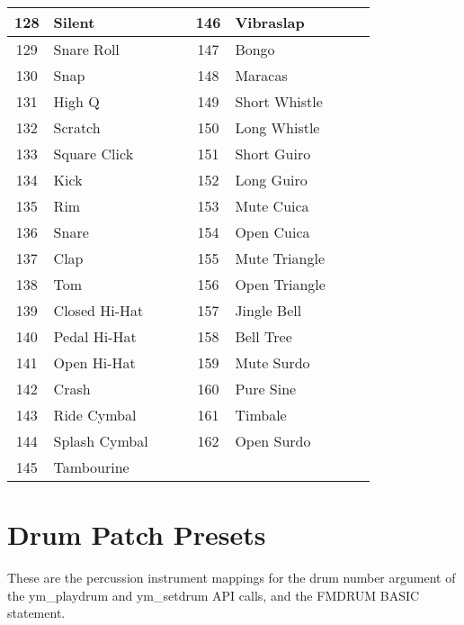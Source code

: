 \begin{tabular}{|c|p{0.4\linewidth}|c|p{0.4\linewidth}|}
	\hline
	128 & Silent & 146 & Vibraslap \\ \hline
	129 & Snare Roll & 147 & Bongo \\ \hline
	130 & Snap & 148 & Maracas \\ \hline
	131 & High Q & 149 & Short Whistle \\ \hline
	132 & Scratch & 150 & Long Whistle \\ \hline
	133 & Square Click & 151 & Short Guiro \\ \hline
	134 & Kick & 152 & Long Guiro \\ \hline
	135 & Rim & 153 & Mute Cuica \\ \hline
	136 & Snare & 154 & Open Cuica \\ \hline
	137 & Clap & 155 & Mute Triangle \\ \hline
	138 & Tom & 156 & Open Triangle \\ \hline
	139 & Closed Hi-Hat & 157 & Jingle Bell \\ \hline
	140 & Pedal Hi-Hat & 158 & Bell Tree \\ \hline
	141 & Open Hi-Hat & 159 & Mute Surdo \\ \hline
	142 & Crash & 160 & Pure Sine \\ \hline
	143 & Ride Cymbal & 161 & Timbale \\ \hline
	144 & Splash Cymbal & 162 & Open Surdo \\ \hline
	145 & Tambourine & & \\ \hline
\end{tabular}

\clearpage

\section {Drum Patch Presets}

These are the percussion instrument mappings for the drum number argument of
the {\ttfamily ym\_playdrum} and {\ttfamily ym\_setdrum} API calls, and the
{\ttfamily FMDRUM} BASIC statement.\\

